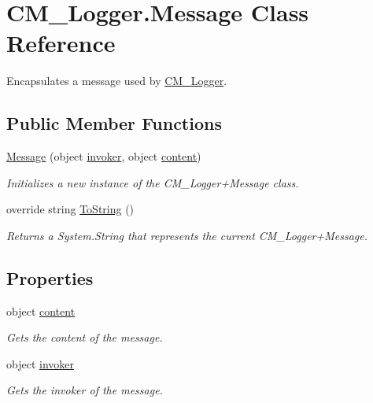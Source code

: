 \hypertarget{class_c_m___logger_1_1_message}{}\section{C\+M\+\_\+\+Logger.\+Message Class Reference}
\label{class_c_m___logger_1_1_message}


Encapsulates a message used by \hyperlink{class_c_m___logger}{C\+M\+\_\+\+Logger}.  


\subsection*{Public Member Functions}
\begin{DoxyCompactItemize}
\item 
\hyperlink{class_c_m___logger_1_1_message_af8da84fc7f2102870ce62695f3e2a38a}{Message} (object \hyperlink{class_c_m___logger_1_1_message_ad9921bbcd73048b60d9ba2c3b77286ae}{invoker}, object \hyperlink{class_c_m___logger_1_1_message_ac403c59f0f7f9452ad2cc3d7abf22844}{content})
\begin{DoxyCompactList}\small\item\em Initializes a new instance of the C\+M\+\_\+\+Logger+\+Message class. \end{DoxyCompactList}\item 
override string \hyperlink{class_c_m___logger_1_1_message_a011dbf54bd844f4400f30d9acacee254}{To\+String} ()
\begin{DoxyCompactList}\small\item\em Returns a System.\+String that represents the current C\+M\+\_\+\+Logger+\+Message. \end{DoxyCompactList}\end{DoxyCompactItemize}
\subsection*{Properties}
\begin{DoxyCompactItemize}
\item 
object \hyperlink{class_c_m___logger_1_1_message_ac403c59f0f7f9452ad2cc3d7abf22844}{content}
\begin{DoxyCompactList}\small\item\em Gets the content of the message. \end{DoxyCompactList}\item 
object \hyperlink{class_c_m___logger_1_1_message_ad9921bbcd73048b60d9ba2c3b77286ae}{invoker}
\begin{DoxyCompactList}\small\item\em Gets the invoker of the message. \end{DoxyCompactList}\end{DoxyCompactItemize}


